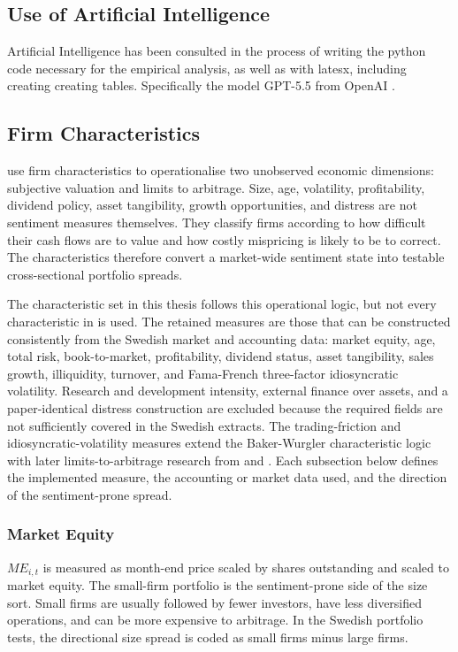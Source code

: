 \documentclass[11pt]{article}
\newcommand{\var}[1]{\ensuremath{#1}}
\begin{document}
\subsection{Use of Artificial Intelligence}
Artificial Intelligence has been consulted in the process of writing the python code necessary for the empirical analysis, as well as with latesx, including creating creating tables. Specifically the model GPT-5.5 from OpenAI \citep{openai2026gpt55}.

\subsection{Firm Characteristics}
\citet{baker2006sentiment} use firm characteristics to operationalise two unobserved economic dimensions: subjective valuation and limits to arbitrage. Size, age, volatility, profitability, dividend policy, asset tangibility, growth opportunities, and distress are not sentiment measures themselves. They classify firms according to how difficult their cash flows are to value and how costly mispricing is likely to be to correct. The characteristics therefore convert a market-wide sentiment state into testable cross-sectional portfolio spreads.

The characteristic set in this thesis follows this operational logic, but not every characteristic in \citet{baker2006sentiment} is used. The retained measures are those that can be constructed consistently from the Swedish market and accounting data: market equity, age, total risk, book-to-market, profitability, dividend status, asset tangibility, sales growth, illiquidity, turnover, and Fama-French three-factor idiosyncratic volatility. Research and development intensity, external finance over assets, and a paper-identical distress construction are excluded because the required fields are not sufficiently covered in the Swedish extracts. The trading-friction and idiosyncratic-volatility measures extend the Baker-Wurgler characteristic logic with later limits-to-arbitrage research from \citet{stambaugh2012short} and \citet{stambaugh2015ivol}. Each subsection below defines the implemented measure, the accounting or market data used, and the direction of the sentiment-prone spread.

\subsubsection{Market Equity}
\var{ME_{i,t}} is measured as month-end price scaled by shares outstanding and scaled to market equity. The small-firm portfolio is the sentiment-prone side of the size sort. Small firms are usually followed by fewer investors, have less diversified operations, and can be more expensive to arbitrage. In the Swedish portfolio tests, the directional size spread is coded as small firms minus large firms.
\end{document}
